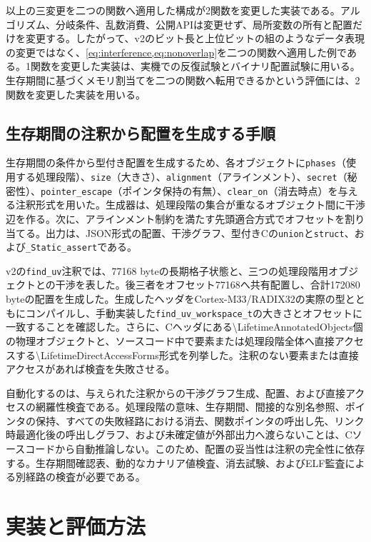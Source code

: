 \documentclass[a4paper,10pt]{ltjsarticle}
\theoremstyle{definition}
\theoremstyle{remark}
\begin{document}
以上の三変更を二つの関数へ適用した構成が2関数を変更した実装である。アルゴリズム、分岐条件、乱数消費、公開APIは変更せず、局所変数の所有と配置だけを変更する。したがって、v2のビット長と上位ビットの組のようなデータ表現の変更ではなく、\cref{eq:interference,eq:nonoverlap}を二つの関数へ適用した例である。1関数を変更した実装は、実機での反復試験とバイナリ配置試験に用いる。生存期間に基づくメモリ割当てを二つの関数へ転用できるかという評価には、2関数を変更した実装を用いる。

\subsection{生存期間の注釈から配置を生成する手順}

生存期間の条件から型付き配置を生成するため、各オブジェクトに\texttt{phases}（使用する処理段階）、\texttt{size}（大きさ）、\texttt{alignment}（アラインメント）、\texttt{secret}（秘密性）、\texttt{pointer\_escape}（ポインタ保持の有無）、\texttt{clear\_on}（消去時点）を与える注釈形式を用いた。生成器は、処理段階の集合が重なるオブジェクト間に干渉辺を作る。次に、アラインメント制約を満たす先頭適合方式でオフセットを割り当てる。出力は、JSON形式の配置、干渉グラフ、型付きCの\texttt{union}と\texttt{struct}、および\texttt{\_Static\_assert}である。

v2の\texttt{find\_uv}注釈では、\num{77168} byteの長期格子状態と、三つの処理段階用オブジェクトとの干渉を表した。後三者をオフセット\num{77168}へ共有配置し、合計\num{172080} byteの配置を生成した。生成したヘッダをCortex-M33/RADIX32の実際の型とともにコンパイルし、手動実装した\texttt{find\_uv\_workspace\_t}の大きさとオフセットに一致することを確認した。さらに、Cヘッダにある\num{\LifetimeAnnotatedObjects}個の物理オブジェクトと、ソースコード中で要素または処理段階全体へ直接アクセスする\num{\LifetimeDirectAccessForms}形式を列挙した。注釈のない要素または直接アクセスがあれば検査を失敗させる。

自動化するのは、与えられた注釈からの干渉グラフ生成、配置、および直接アクセスの網羅性検査である。処理段階の意味、生存期間、間接的な別名参照、ポインタの保持、すべての失敗経路における消去、関数ポインタの呼出し先、リンク時最適化後の呼出しグラフ、および未確定値が外部出力へ渡らないことは、Cソースコードから自動推論しない。このため、配置の妥当性は注釈の完全性に依存する。生存期間確認表、動的なカナリア値検査、消去試験、およびELF監査による別経路の検査が必要である。

\section{実装と評価方法}
\label{sec:implementation}
\label{sec:evaluation-method}
\end{document}

